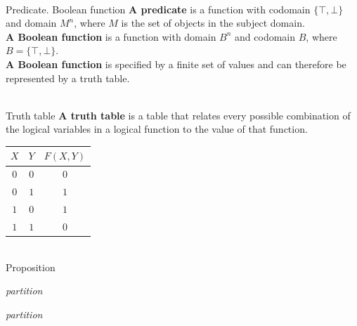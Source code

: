 \begin{frame}{\\Predicate. Boolean function}
	\topline
	\textbf{A predicate} is a function with codomain $\{\top, \bot\}$ and domain $M^n$, where $M$ is the set of objects in the subject domain.\\
	\textbf{A Boolean function} is a function with domain $B^n$ and codomain $B$, where $B = \{\top, \bot\}$.\\
	\textbf{A Boolean function} is specified by a finite set of values and can therefore be represented by a truth table.
\end{frame}

\begin{frame}{\\Truth table}
	\topline
	\justifying
	\textbf{A truth table} is a table that relates every possible combination of the logical variables in a logical function to the value of that function.\\
	\vspace{5mm}
	\begin{center}
		\begin{tabular}{|c|c|c|}
			\hline
			$X$ & $Y$ & $F(X,Y)$\\
			\hline
			$0$ & $0$ & $0$\\
			\hline
			$0$ & $1$ & $1$\\
			\hline
			$1$ & $0$ & $1$\\
			\hline
			$1$ & $1$ & $0$\\
			\hline
		\end{tabular}
	\end{center}
\end{frame}

\begin{frame}{\\Proposition}
	\topline
	\justifying
	\begin{SCn}
		\begin{scnreltoset}{\textit{partition}}
		\end{scnreltoset}
		\begin{scnreltoset}{\textit{partition}}
		\end{scnreltoset}
	\end{SCn}
\end{frame}

